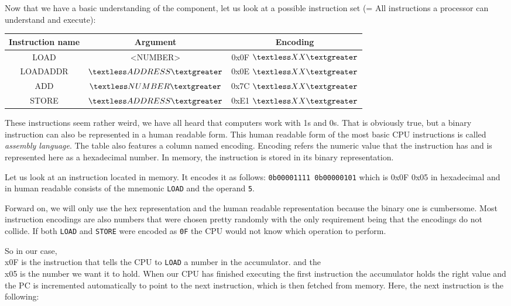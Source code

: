 Now that we have a basic understanding of the component, let us look at a possible instruction set
(= All instructions a processor can understand and execute):

\begin{center}
	\begin{tabular} { | c | c | c | }
	        Instruction name & Argument & Encoding \\
	        \hline
	        LOAD & \textless NUMBER\textgreater & 0x0F $\textless XX\textgreater$  \\
	        LOADADDR & $\textless ADDRESS\textgreater$ & 0x0E $\textless XX\textgreater$  \\
	        ADD & $\textless NUMBER\textgreater$ & 0x7C $\textless XX\textgreater$  \\
	        STORE & $\textless ADDRESS\textgreater$ & 0xE1 $\textless XX\textgreater$ 
	\end{tabular}
\end{center}


These instructions seem rather weird, we have all heard that
computers work with 1s and 0s. That is obviously true, but a binary instruction
can also be represented in a human readable form. This human readable form of the
most basic CPU instructions is called \textit{assembly language}. The table also features
a column named encoding. Encoding refers the numeric value that the instruction has
and is represented here as a hexadecimal number. In memory, the instruction is 
stored in its binary representation.

Let us look at an instruction located in memory. It encodes it as follows: \texttt{0b00001111 0b00000101}
which is 0x0F 0x05 in hexadecimal and in human readable consists of the mnemonic
\texttt{LOAD} and the operand \texttt{5}.

Forward on, we will only use the hex representation and the human readable representation
because the binary one is cumbersome. Most instruction encodings are also numbers that were
chosen pretty randomly with the only requirement being that the encodings do not collide.
If both \texttt{LOAD} and \texttt{STORE} were encoded as \texttt{0F} the CPU would not know which operation to
perform.

So in our case, \\x0F is the instruction that tells the CPU to \texttt{LOAD} a number in the accumulator.
and the \\x05 is the number we want it to hold. When our CPU has finished executing the first
instruction the accumulator holds the right value and the PC is incremented automatically to point
to the next instruction, which is then fetched from memory. Here, the next instruction is the
following:

